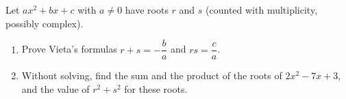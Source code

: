 Let $ax^2+bx+c$ with $a\ne0$ have roots $r$ and $s$ (counted with multiplicity, possibly complex).
\begin{enumerate}
\item[(a)] Prove Vieta's formulas $r+s=-\dfrac {b}{a}$ and $rs=\dfrac {c}{a}$.
\item[(b)] Without solving, find the sum and the product of the roots of $2x^2-7x+3$, and the value of $r^2+s^2$ for these roots.
\end{enumerate}
